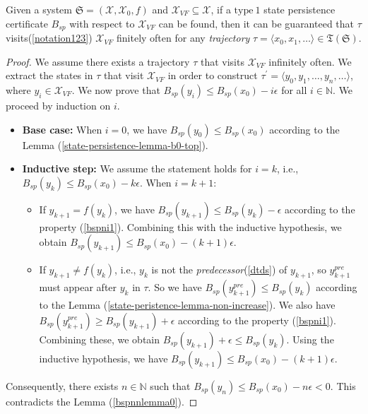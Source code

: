 \begin{theorem}[persistence]
  Given a system $\mathfrak{S}=(\mathcal{X}, \mathcal{X}_0, f)$ and $\mathcal{X}_{VF} \subseteq \mathcal{X}$, if a $\mathrm{type~1}$ state persistence certificate $B_{sp}$ with respect to $\mathcal{X}_{VF}$ can be found, then it can be guaranteed that $\tau$ visits(\ref{notation123}) \(\mathcal{X}_{VF}\) finitely often for any \emph{trajectory} $\tau = \langle x_0, x_1, \dots \rangle \in \mathfrak{T}(\mathfrak{S})$.
\end{theorem}

\begin{proof}
We assume there exists a trajectory $\tau$ that visits $\mathcal{X}_{VF}$ infinitely often. We extract the states in $\tau$ that visit $\mathcal{X}_{VF}$ in order to construct $\tau^{\prime} = \langle y_0, y_1, \dots, y_n, \dots \rangle$, where $y_i \in \mathcal{X}_{VF}$. We now prove that $B_{sp}(y_i) \leq B_{sp}(x_0) - i\epsilon$ for all $i \in \mathbb{N}$.
We proceed by induction on $i$.
\begin{itemize}
    \item \textbf{Base case:} When $i = 0$, we have $B_{sp}(y_0) \leq B_{sp}(x_0)$ according to the Lemma (\ref{state-persistence-lemma-b0-top}).
    \item \textbf{Inductive step:} We assume the statement holds for $i = k$, i.e., $B_{sp}(y_k) \leq B_{sp}(x_0) - k\epsilon$. When $i = k + 1$:
    \begin{itemize}
        \item If $y_{k+1} = f(y_k)$, we have $B_{sp}(y_{k+1}) \leq B_{sp}(y_k) - \epsilon$ according to the property (\ref{bspni1}). Combining this with the inductive hypothesis, we obtain $B_{sp}(y_{k+1}) \leq B_{sp}(x_0) - (k + 1)\epsilon$.
        \item If $y_{k+1} \neq  f(y_k)$, i.e., $y_k$ is not the \emph{predecessor}(\ref{dtds}) of $y_{k+1}$, so $y_{k+1}^{pre}$ must appear after $y_k$ in $\tau$.
        So we have $B_{sp}(y_{k+1}^{pre}) \leq B_{sp}(y_k)$ according to the Lemma (\ref{state-peristence-lemma-non-increase}).
        We also have $B_{sp}(y_{k+1}^{pre}) \geq  B_{sp}(y_{k+1}) + \epsilon$ according to the property (\ref{bspni1}).
        Combining these, we obtain $B_{sp}(y_{k+1}) + \epsilon \leq B_{sp}(y_k)$.
        Using the inductive hypothesis, we have $B_{sp}(y_{k+1}) \leq B_{sp}(x_0) - (k + 1)\epsilon$.
    \end{itemize}
\end{itemize}
Consequently, there exists $n \in \mathbb{N}$ such that $B_{sp}(y_n) \leq B_{sp}(x_0) - n\epsilon < 0$. This contradicts the Lemma (\ref{bspnnlemma0}).
\end{proof}

